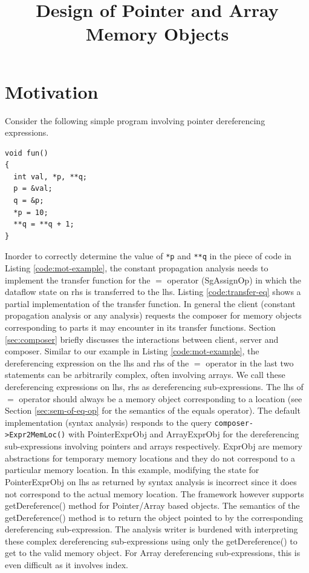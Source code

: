 \documentclass{article}
\begin{document}
\title{Design of Pointer and Array Memory Objects}
\date{}
\maketitle
\section{Motivation}
Consider the following simple program involving pointer dereferencing expressions.
\lstset{
caption=Motivating Example,
label=code:mot-example
}
\begin{lstlisting}
void fun()
{
  int val, *p, **q;
  p = &val;
  q = &p;
  *p = 10;
  **q = **q + 1;
}
\end{lstlisting}

\noindent Inorder to correctly determine the value of \texttt{*p} and \texttt{**q} in the piece of
code in  Listing \ref{code:mot-example}, the constant propagation analysis needs to
implement the transfer function for the $=$ operator (SgAssignOp) in which
the dataflow state on rhs is transferred to the lhs. Listing  \ref{code:transfer-eq} shows a partial
implementation  of the transfer function. In general the client
(constant propagation analysis or any analysis)  requests the composer for memory
objects  corresponding to parts it may encounter in its transfer
functions. Section \ref{sec:composer} briefly discusses the interactions between client, server and composer. Similar to our example in Listing \ref{code:mot-example},
the dereferencing expression on the lhs and rhs of the $=$ operator in the last two statements can be
arbitrarily  complex, often involving arrays. We call these dereferencing expressions on lhs, rhs as dereferencing sub-expressions. 
The lhs of $=$ operator should always be a memory object corresponding to a location (see Section
\ref{sec:sem-of-eq-op}  for the semantics of the equals operator).
The default implementation  (syntax analysis) responds to the query \texttt{composer->Expr2MemLoc()} with PointerExprObj and
ArrayExprObj  for the dereferencing sub-expressions involving pointers and arrays
respectively. ExprObj are memory abstractions for temporary memory locations and they do not correspond to a particular memory location.
In this example, modifying the state for PointerExprObj on lhs as returned by syntax analysis
is incorrect  since it does not correspond to the actual memory
location. The  framework however supports getDereference() method for
Pointer/Array based objects. The semantics of the getDereference()
method is  to return the object pointed to by the corresponding
dereferencing sub-expression. The analysis writer is burdened with
interpreting  these complex dereferencing sub-expressions using only the getDereference() to
get to the valid memory object. For Array dereferencing sub-expressions, this is even difficult as it involves index.
\end{document}

